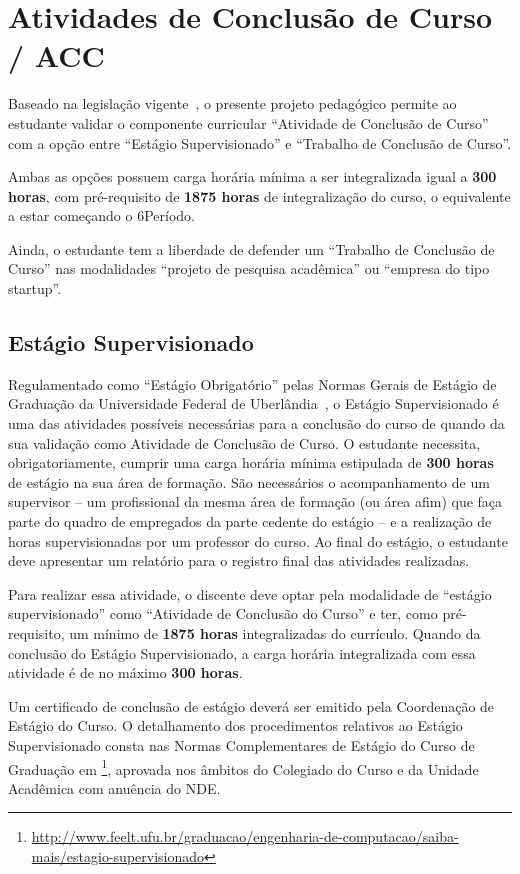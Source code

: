\section{Atividades de Conclusão de Curso / ACC}
\label{sec:acc_conclusao}

Baseado na legislação vigente~\cite{cne_ces_5_2016}, o presente projeto pedagógico permite ao estudante validar o componente curricular ``Atividade de Conclusão de Curso'' com a opção entre ``Estágio Supervisionado'' e ``Trabalho de Conclusão de Curso''.

Ambas as opções possuem carga horária mínima a ser integralizada igual a \textbf{300 horas}\unskip, com pré-requisito de \textbf{1875 horas} de integralização do curso, o equivalente a estar começando o 6 Período.

Ainda, o estudante tem a liberdade de defender um ``Trabalho de Conclusão de Curso'' nas modalidades ``projeto de pesquisa acadêmica'' ou ``empresa do tipo startup''.

\subsection{Estágio Supervisionado}

Regulamentado como ``Estágio Obrigatório'' pelas Normas Gerais de Estágio de Graduação da Universidade Federal de Uberlândia~\cite{ufu_congrad_93_2023}, o Estágio Supervisionado é uma das atividades possíveis necessárias para a conclusão do curso de \ppccurso quando da sua validação como Atividade de Conclusão de Curso. O estudante necessita, obrigatoriamente, cumprir uma carga horária mínima estipulada de \textbf{300 horas} de estágio na sua área de formação. São necessários o acompanhamento de um supervisor -- um profissional da mesma área de formação (ou área afim) que faça parte do quadro de empregados da parte cedente do estágio -- e a realização de horas supervisionadas por um professor do curso. Ao final do estágio, o estudante deve apresentar um relatório para o registro final das atividades realizadas.

Para realizar essa atividade, o discente deve optar pela modalidade de ``estágio supervisionado'' como ``Atividade de Conclusão do Curso'' e ter, como pré-requisito, um mínimo de \textbf{1875 horas} integralizadas do currículo. Quando da conclusão do Estágio Supervisionado, a carga horária integralizada com essa atividade é de no máximo \textbf{300 horas}\unskip.

Um certificado de conclusão de estágio deverá ser emitido pela Coordenação de Estágio do Curso. O detalhamento dos procedimentos relativos ao Estágio Supervisionado consta nas Normas Complementares de Estágio do Curso de Graduação em \ppccurso\footnote{\url{http://www.feelt.ufu.br/graduacao/engenharia-de-computacao/saiba-mais/estagio-supervisionado}}, aprovada nos âmbitos do Colegiado do Curso e da Unidade Acadêmica com anuência do NDE.

